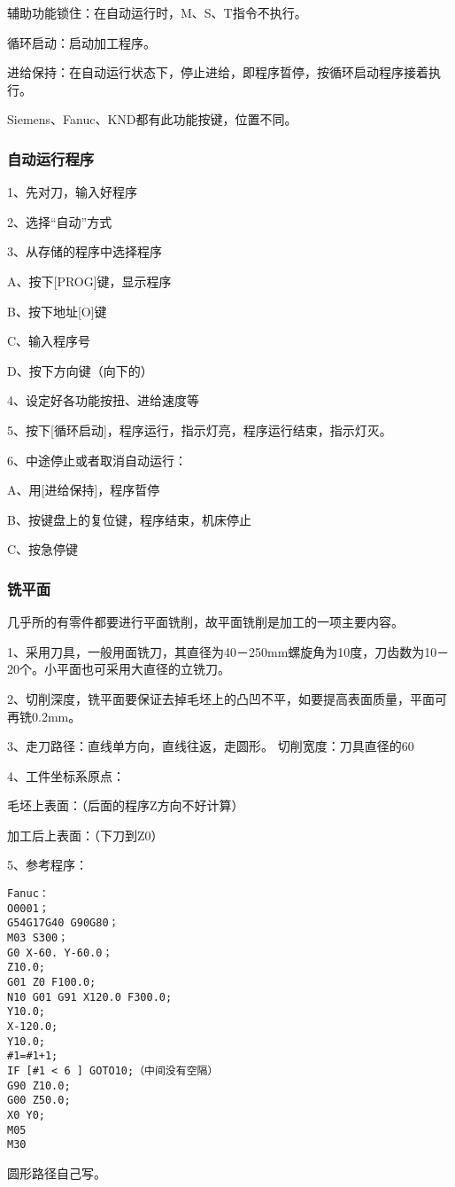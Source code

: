 辅助功能锁住：在自动运行时，M、S、T指令不执行。

循环启动：启动加工程序。

进给保持：在自动运行状态下，停止进给，即程序晢停，按循环启动程序接着执行。

Siemens、Fanuc、KND都有此功能按键，位置不同。

\subsubsection{自动运行程序}
1、先对刀，输入好程序

2、选择“自动”方式

3、从存储的程序中选择程序

A、按下[PROG]键，显示程序

B、按下地址[O]键

C、输入程序号

D、按下方向键（向下的）

4、设定好各功能按扭、进给速度等

5、按下[循环启动]，程序运行，指示灯亮，程序运行结束，指示灯灭。

6、中途停止或者取消自动运行：

A、用[进给保持]，程序晢停

B、按键盘上的复位键，程序结束，机床停止

C、按急停键


\subsubsection{铣平面}

几乎所的有零件都要进行平面铣削，故平面铣削是加工的一项主要内容。

1、采用刀具，一般用面铣刀，其直径为40－250mm螺旋角为10度，刀齿数为10－20个。小平面也可采用大直径的立铣刀。

2、切削深度，铣平面要保证去掉毛坯上的凸凹不平，如要提高表面质量，平面可再铣0.2mm。

3、走刀路径：直线单方向，直线往返，走圆形。
切削宽度：刀具直径的60%

4、工件坐标系原点：

毛坯上表面：（后面的程序Z方向不好计算）

加工后上表面：（下刀到Z0）

5、参考程序：

\begin{lstlisting}
Fanuc：
O0001；
G54G17G40 G90G80；
M03 S300；
G0 X-60. Y-60.0；
Z10.0;
G01 Z0 F100.0;
N10 G01 G91 X120.0 F300.0;
Y10.0;
X-120.0;
Y10.0;
#1=#1+1;
IF [#1 < 6 ] GOTO10;（中间没有空隔）
G90 Z10.0;
G00 Z50.0;
X0 Y0;
M05 
M30
\end{lstlisting}
圆形路径自己写。


